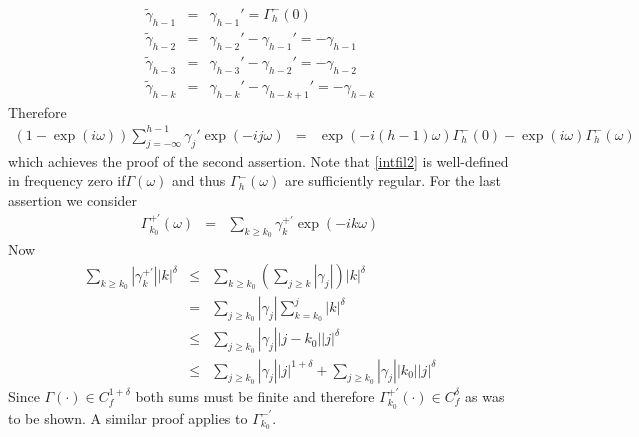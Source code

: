 \documentclass[11pt]{article}
\begin{document}
\begin{appendix}
\begin{eqnarray*}
\end{eqnarray*}
\begin{eqnarray*}
\tilde{\gamma}_{h-1}&=&\gamma_{h-1}'=\Gamma_{h}^-(0)\\
\tilde{\gamma}_{h-2}&=&\gamma_{h-2}'-\gamma_{h-1}'=-\gamma_{h-1}\\
\tilde{\gamma}_{h-3}&=&\gamma_{h-3}'-\gamma_{h-2}'=-\gamma_{h-2}\\
\tilde{\gamma}_{h-k}&=&\gamma_{h-k}'-\gamma_{h-k+1}'=-\gamma_{h-k}
\end{eqnarray*}
Therefore
\begin{eqnarray*}
(1-\exp(i\omega))\sum_{j=-\infty}^{h-1}\gamma_j'\exp(-ij\omega)&=&\exp(-i(h-1)\omega)\Gamma_{h}^-(0)-\exp(i\omega)\Gamma_{h}^-(\omega)
\end{eqnarray*}
which achieves the proof of the second assertion. Note that
\ref{intfil2} is well-defined in frequency zero if$\Gamma(\omega)$ and thus $\Gamma_{h}^-(\omega)$
are sufficiently regular. For the last assertion we consider
\begin{eqnarray*}
\Gamma_{k_0}^{+'}(\omega)&=&\sum_{k\geq k_0}\gamma_k^{+'}\exp(-ik\omega)
\end{eqnarray*}
Now
\begin{eqnarray*}
\sum_{k\geq k_0}|\gamma_k^{+'}| |k|^\delta&\leq&\sum_{k\geq k_0}\left(\sum_{j\geq k}\left|\gamma_j\right|\right)|k|^\delta\\
&=&\sum_{j\geq k_0}|\gamma_j|\sum_{k=k_0}^j|k|^\delta\\
&\leq&\sum_{j\geq k_0}|\gamma_j||j-k_0||j|^\delta\\
&\leq&\sum_{j\geq k_0}|\gamma_j||j|^{1+\delta}+\sum_{j\geq k_0}|\gamma_j||k_0||j|^{\delta} 
\end{eqnarray*}
Since $\Gamma(\cdot) \in C_f^{1+\delta}$ both sums must be finite and therefore $\Gamma_{k_0}^{+'}(\cdot)\in
C_f^{\delta}$ as was to be shown. A similar proof applies to $\Gamma_{k_0}^{-'}$.\\




\end{appendix}
\end{document}
